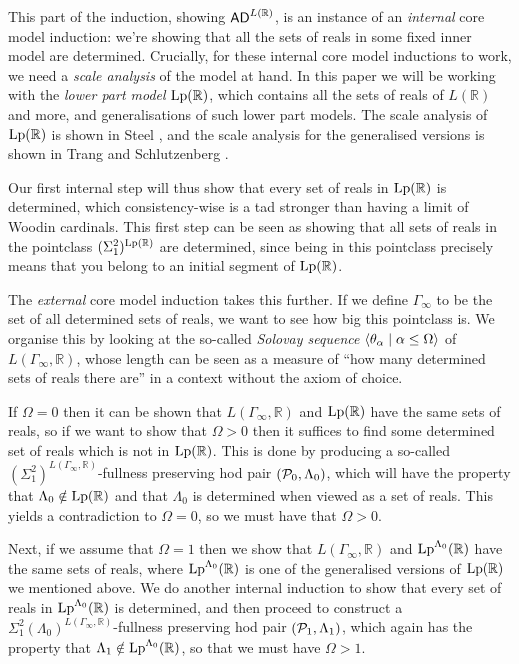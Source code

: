 \documentclass[../../main]{subfiles}
\begin{document}
\qquad This part of the induction, showing $\ad^{L{(\mathbb R)}}$, is an instance of an \textit{internal} core model induction: we're showing that all the sets of reals in some fixed inner model are determined. Crucially, for these internal core model inductions to work, we need a \textit{scale analysis} of the model at hand. In this paper we will be working with the \textit{lower part model} $\lp(\mathbb R)$, which contains all the sets of reals of $L(\mathbb R)$ and more, and generalisations of such lower part models. The scale analysis of $\lp(\mathbb R)$ is shown in Steel , and the scale analysis for the generalised versions is shown in Trang and Schlutzenberg .

\qquad Our first internal step will thus show that every set of reals in $\lp(\mathbb R)$ is determined, which consistency-wise is a tad stronger than having a limit of Woodin cardinals. This first step can be seen as showing that all sets of reals in the pointclass $(\Sigma^2_1)^{\lp(\mathbb R)}$  are determined, since being in this pointclass precisely means that you belong to an initial segment of $\lp(\mathbb R)$.

\qquad The \textit{external} core model induction takes this further. If we define $\Gamma_\infty$ to be the set of all determined sets of reals, we want to see how big this pointclass is. We organise this by looking at the so-called \textit{Solovay sequence} $\bra{\theta_\alpha\mid\alpha\leq\Omega}$ of $L(\Gamma_\infty,\mathbb R)$, whose length can be seen as a measure of ``how many determined sets of reals there are'' in a context without the axiom of choice.

\qquad If $\Omega=0$ then it can be shown that $L(\Gamma_\infty,\mathbb R)$ and $\lp(\mathbb R)$ have the same sets of reals, so if we want to show that $\Omega>0$ then it suffices to find some determined set of reals which is not in $\lp(\mathbb R)$. This is done by producing a so-called $(\Sigma^2_1)^{L(\Gamma_\infty,\mathbb R)}$-fullness preserving hod pair $(\P_0,\Lambda_0)$, which will have the property that $\Lambda_0\notin\lp(\mathbb R)$ and that $\Lambda_0$ is determined when viewed as a set of reals. This yields a contradiction to $\Omega=0$, so we must have that $\Omega>0$.

\qquad Next, if we assume that $\Omega=1$ then we show that $L(\Gamma_\infty,\mathbb R)$ and $\lp^{\Lambda_0}(\mathbb R)$ have the same sets of reals, where $\lp^{\Lambda_0}(\mathbb R)$ is one of the generalised versions of $\lp(\mathbb R)$ we mentioned above. We do another internal induction to show that every set of reals in $\lp^{\Lambda_0}(\mathbb R)$ is determined, and then proceed to construct a $\Sigma^2_1(\Lambda_0)^{L(\Gamma_\infty,\mathbb R)}$-fullness preserving hod pair $(\P_1,\Lambda_1)$, which again has the property that $\Lambda_1\notin\lp^{\Lambda_0}(\mathbb R)$, so that we must have $\Omega>1$.
\end{document}
